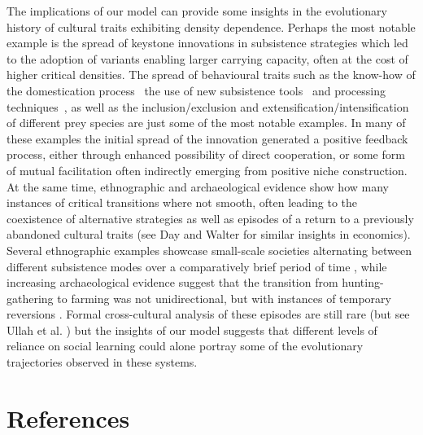 \documentclass[review,authoryear]{elsarticle}
\begin{document}
The implications of our model can provide some insights in the evolutionary history of cultural traits exhibiting density dependence. Perhaps the most notable example is the spread of keystone innovations in subsistence strategies which led to the adoption of variants enabling larger carrying capacity, often at the cost of higher critical densities. The spread of behavioural traits such as the know-how of the domestication process~\citep{barker2006} the use of new subsistence tools~\citep{petraglia_population_2009} and processing techniques~\citep{molleson1993}, as well as the inclusion/exclusion and extensification/intensification of different prey species are just some of the most notable examples. In many of these examples the initial spread of the innovation generated a positive feedback process, either through enhanced possibility of direct cooperation, or some form of mutual facilitation often indirectly emerging from positive niche construction. At the same time, ethnographic and archaeological evidence show how many instances of critical transitions where not smooth, often leading to the coexistence of alternative strategies as well as episodes of a return to a previously abandoned cultural traits (see Day and Walter \citeyear{day_and_walter_1989} for similar insights in economics). Several ethnographic examples showcase small-scale societies alternating between different subsistence modes over a comparatively brief period of time \citep{layton1991,mace_1993,oota_et_al_2005}, while increasing archaeological evidence suggest that the transition from hunting-gathering to farming was not unidirectional, but with instances of temporary reversions \citep{rowley2001,stevens_fuller_2012}. Formal cross-cultural analysis of these episodes are still rare (but see Ullah et al. \citeyear{ullah_etal_2015}) but the insights of our model suggests that different levels of reliance on social learning could alone portray some of the evolutionary trajectories observed in these systems. 

\section{References}



\end{document}
